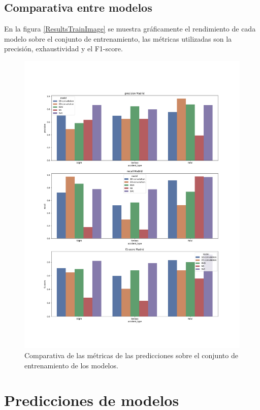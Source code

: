   \subsection{Comparativa entre modelos}

  En la figura \eqref{ResultsTrainImage} se muestra gráficamente el rendimiento de cada modelo sobre el conjunto de entrenamiento, las métricas utilizadas son la precisión, exhaustividad y el F1-score.

  \begin{figure}[H]
      \centering
      \includegraphics[width=13cm]{archivos/5.Resultados/ComparativaTrain}
      \caption{Comparativa de las métricas de las predicciones sobre el conjunto de entrenamiento de los modelos.}
      \label{ResultsTrainImage}
   \end{figure}



\section{Predicciones de modelos}

